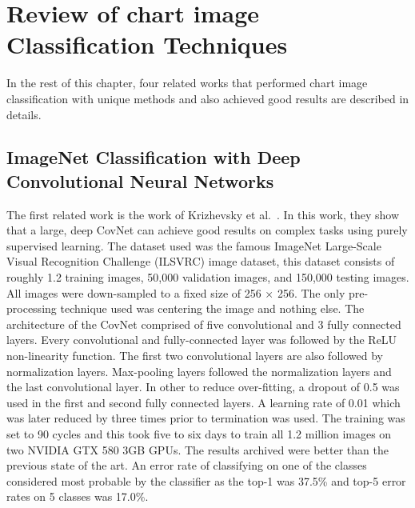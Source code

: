 \documentclass[12pt, a4paper,oneside]{report}
\begin{document}
\section{Review of chart image Classification Techniques}
In the rest of this chapter, four related works that performed chart image classification with unique methods and also achieved good results are described in details.  

\subsection{ImageNet Classification with Deep Convolutional    Neural Networks}
The first related work is the work of Krizhevsky et al.~\cite{krizhevsky2012imagenet}. In this work, they show that a large, deep CovNet can achieve good results on complex tasks using purely supervised learning. The dataset used was the famous ImageNet Large-Scale Visual Recognition Challenge (ILSVRC) image dataset, this dataset consists of roughly 1.2 training images, 50,000 validation images, and 150,000 testing images. All images were down-sampled to a fixed size of 256 × 256. The only pre-processing technique used was centering the image and nothing else. The architecture of the CovNet comprised of five convolutional and 3 fully connected layers. Every convolutional and fully-connected layer was followed by the ReLU
non-linearity function. The first two convolutional layers are also followed by normalization layers. Max-pooling layers followed the normalization layers and the last convolutional layer. In other to reduce over-fitting, a dropout of 0.5 was used in the first and second fully connected layers. A learning rate of 0.01 which was later reduced by three times prior to termination was used. The training was set to 90 cycles and this took five to six days to train all 1.2 million images on two NVIDIA GTX 580 3GB GPUs. The results archived were better than the previous state of the art. An error rate of classifying on one of the classes considered most probable by the classifier as the top-1 was 37.5\% and top-5 error rates on 5 classes was 17.0\%.
\end{document}
